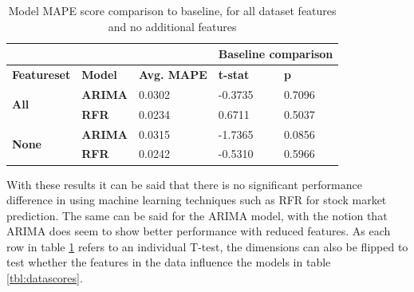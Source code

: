 \begin{table}[H]
\begin{tabular}{lllll|}
\cline{4-5}
\multicolumn{3}{l|}{}                                                                                                                        & \multicolumn{2}{l|}{\textbf{Baseline comparison}} \\ \hline
\multicolumn{1}{|l|}{\textbf{Featureset}}                    & \multicolumn{1}{l|}{\textbf{Model}} & \multicolumn{1}{l|}{\textbf{Avg. MAPE}} & \multicolumn{1}{l|}{\textbf{t-stat}}  & \textbf{p} \\ \hline
\multicolumn{1}{|l|}{\multirow{2}{*}{\textbf{All}}} & \multicolumn{1}{|l|}{\textbf{ARIMA}}                      & 0.0302                                  & -0.3735                               & 0.7096     \\ \cline{2-5} 
\multicolumn{1}{|l|}{}                                       & \multicolumn{1}{|l|}{\textbf{RFR}}                        & 0.0234                                  & 0.6711                                & 0.5037     \\ \hline
\multicolumn{1}{|l|}{\multirow{2}{*}{\textbf{None}}}  & \multicolumn{1}{|l|}{\textbf{ARIMA}}                      & 0.0315                                  & -1.7365                               & 0.0856     \\ \cline{2-5} 
\multicolumn{1}{|l|}{}                                       & \multicolumn{1}{|l|}{\textbf{RFR}}                        & 0.0242                                  & -0.5310                               & 0.5966     \\ \hline
\end{tabular}
\caption{Model MAPE score comparison to baseline, for all dataset features and no additional features}
\label{tbl:modelscores}
\end{table}

With these results it can be said that there is no significant performance difference in using machine learning techniques such as RFR for stock market prediction. The same can be said for the ARIMA model, with the notion that ARIMA does seem to show better performance with reduced features. As each row in table \ref{tbl:modelscores} refers to an individual T-test, the dimensions can also be flipped to test whether the features in the data influence the models in table \ref{tbl:datascores}.

